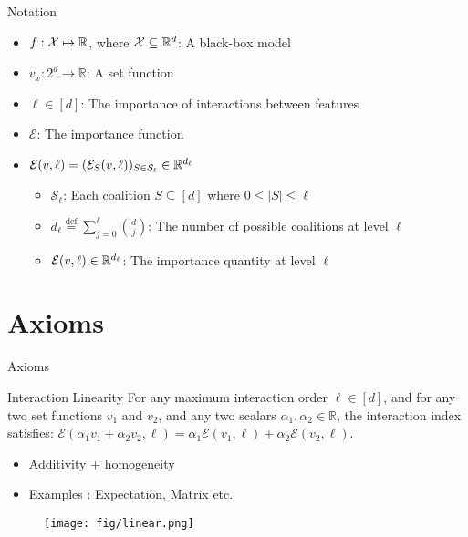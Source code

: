 \documentclass[10pt]{beamer}
\newcommand{\f}{v}
\newcommand{\x}{x}
\newcommand{\ex}{\Expl}
\def\Expl{\mathcal{E}}
\newcommand*{\defeq}{\stackrel{\text{def}}{=}}
\begin{document}
\begin{frame}{Notation}
\begin{itemize}
    \itemsep1.5em %
    \item $f : \mathcal{X} \mapsto \mathbb{R}$, where $\mathcal{X} \subseteq \mathbb{R}^d$: A black-box model
    \item $\f_{\x} : 2^d \rightarrow \mathbb{R}$: A set function
    \item $\ell \in [d]$: The importance of interactions between features
    \item $\ex$: The importance function
    \item $\ex(\f, \ell) = (\ex_{S}(\f, \ell))_{S \in \mathcal{S}_\ell} \in \R^{d_\ell}$
    \begin{itemize}
        \vspace{0.3cm}
        \itemsep1.2em
        \item $\mathcal{S}_\ell$: Each coalition $S \subseteq [d]$ where $0 \leq |S| \leq \ell$
        \item $d_{\ell} \defeq \sum_{j=0}^{\ell} \binom{d}{j}$: The number of possible coalitions at level $\ell$
        \item $\ex(\f, \ell) \in \R^{d_\ell}$: The importance quantity at level $\ell$
    \end{itemize}
\end{itemize}
\end{frame}
\section[Axioms]{Axioms}

\begin{frame}{Axioms}
    \begin{myaxiombox}{Interaction Linearity}
    For any maximum interaction order $\ell \in [d]$, and for any two set functions $\f_1$ and $\f_2$, and any two scalars $\alpha_1, \alpha_2 \in \mathbb{R}$, the interaction index satisfies: $\ex(\alpha_1 \f_1+ \alpha_2 \f_2,\ell) = \alpha_1 \ex(\f_1,\ell) + \alpha_2 \ex(\f_2,\ell)$.
    \end{myaxiombox}
    \vspace{1.5em}
    \begin{itemize}[label=\scalebox{0.5}{$\blacksquare$}]
        \item Additivity + homogeneity
        \item Examples : Expectation, Matrix etc.
    \end{itemize}
\end{frame}
\begin{frame}
    \begin{figure}[h]
    \centering
    \texttt{[image: fig/linear.png]}
    \end{figure}
\end{frame}
\end{document}
